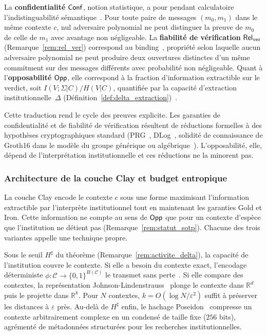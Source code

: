 \begin{sloppypar}
La \textbf{confidentialit\'e} $\mathsf{Conf}$, notion statistique, a pour pendant calculatoire l'indistinguabilit\'e s\'emantique~\cite{GoldwasserMicali84,MicaliRackoff91}. Pour
toute paire de messages $(m_0, m_1)$ dans le m\^eme contexte $c$, nul adversaire polynomial
ne peut distinguer la preuve de $m_0$ de celle de $m_1$ avec avantage non n\'egligeable.
La \textbf{fiabilit\'e de v\'erification} $\mathsf{Rel}_{\mathrm{ver}}$ (Remarque~\ref{rem:rel_ver}) correspond au binding~\cite{Pedersen91,Damgard87}, propri\'et\'e selon laquelle aucun adversaire polynomial ne peut
produire deux ouvertures distinctes d'un m\^eme commitment sur des messages diff\'erents avec
probabilit\'e non n\'egligeable. Quant \`a l'\textbf{opposabilit\'e} $\mathsf{Opp}$, elle correspond \`a
la fraction d'information extractible sur le verdict, soit $I(V;\Sigma|C)/H(V|C)$, quantifi\'ee
par la capacit\'e d'extraction institutionnelle~$\Delta$ (D\'efinition~\ref{def:delta_extraction})~\cite{Simon82,Miller56,Ericsson95}.

Cette traduction rend le cycle des preuves explicite. Les garanties de confidentialit\'e
et de fiabilit\'e de v\'erification r\'esultent de r\'eductions formelles \`a des hypoth\`eses
cryptographiques standard (PRG~\cite{BlumMicali84,Yao82}, DLog~\cite{DiffieHellman76},
solidit\'e de connaissance de Groth16 dans le mod\`ele du groupe g\'en\'erique ou
alg\'ebrique~\cite{Groth16,FKL18}). L'opposabilit\'e, elle, d\'epend de l'interpr\'etation
institutionnelle et ces r\'eductions ne la minorent pas.

\subsubsection{Architecture de la couche Clay et budget entropique}
\label{subsubsec:couche_clay}

La couche Clay encode le contexte $c$ sous une forme maximisant l'information extractible
par l'interpr\`ete institutionnel tout en maintenant les garanties Gold et Iron. Cette information
ne compte au sens de $\mathsf{Opp}$ que pour un contexte d'esp\`ece que l'institution ne d\'etient pas
(Remarque~\ref{rem:statut_sotp}). Chacune des
trois variantes appelle une technique propre.

Sous le seuil $H^\sharp$ du th\'eor\`eme (Remarque~\ref{rem:activite_delta}), la capacit\'e de
l'institution couvre le contexte. Si elle a besoin du contexte exact, l'encodage d\'eterministe
$\phi:\mathcal{C} \to \{0,1\}^{H(\mathcal{C})}$ le transmet sans perte~\cite{Shannon48}. Si elle
compare des contextes, la repr\'esentation Johnson-Lindenstrauss~\cite{JohnsonLindenstrauss84,Achlioptas2003}
plonge le contexte dans $\mathbb{R}^d$ puis le projette dans $\mathbb{R}^k$. Pour $N$ contextes, $k =
O(\log N/\varepsilon^2)$ suffit \`a pr\'eserver les distances \`a $\varepsilon$ pr\`es. Au-del\`a
de $H^\sharp$ enfin, le hachage Poseidon~\cite{Poseidon2019,Grassi2021} compresse un contexte arbitrairement complexe en
un condens\'e de taille fixe ($256$ bits), agr\'ement\'e de m\'etadonn\'ees structur\'ees pour les
recherches institutionnelles.


\end{sloppypar}
